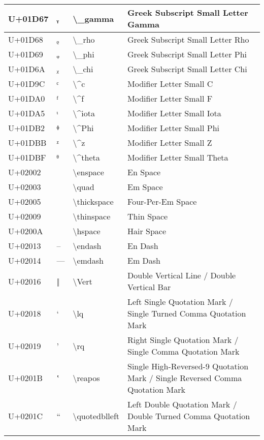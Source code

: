 \begin{table}[h]
\begin{tabulary}{\linewidth}{|L|L|L|L|}
\hline
U+01D67 & ᵧ & {\textbackslash}\_gamma & Greek Subscript Small Letter Gamma \\
\hline
U+01D68 & ᵨ & {\textbackslash}\_rho & Greek Subscript Small Letter Rho \\
\hline
U+01D69 & ᵩ & {\textbackslash}\_phi & Greek Subscript Small Letter Phi \\
\hline
U+01D6A & ᵪ & {\textbackslash}\_chi & Greek Subscript Small Letter Chi \\
\hline
U+01D9C & ᶜ & {\textbackslash}{\textasciicircum}c & Modifier Letter Small C \\
\hline
U+01DA0 & ᶠ & {\textbackslash}{\textasciicircum}f & Modifier Letter Small F \\
\hline
U+01DA5 & ᶥ & {\textbackslash}{\textasciicircum}iota & Modifier Letter Small Iota \\
\hline
U+01DB2 & ᶲ & {\textbackslash}{\textasciicircum}Phi & Modifier Letter Small Phi \\
\hline
U+01DBB & ᶻ & {\textbackslash}{\textasciicircum}z & Modifier Letter Small Z \\
\hline
U+01DBF & ᶿ & {\textbackslash}{\textasciicircum}theta & Modifier Letter Small Theta \\
\hline
U+02002 &   & {\textbackslash}enspace & En Space \\
\hline
U+02003 &   & {\textbackslash}quad & Em Space \\
\hline
U+02005 &   & {\textbackslash}thickspace & Four-Per-Em Space \\
\hline
U+02009 &   & {\textbackslash}thinspace & Thin Space \\
\hline
U+0200A &   & {\textbackslash}hspace & Hair Space \\
\hline
U+02013 & – & {\textbackslash}endash & En Dash \\
\hline
U+02014 & — & {\textbackslash}emdash & Em Dash \\
\hline
U+02016 & ‖ & {\textbackslash}Vert & Double Vertical Line / Double Vertical Bar \\
\hline
U+02018 & ‘ & {\textbackslash}lq & Left Single Quotation Mark / Single Turned Comma Quotation Mark \\
\hline
U+02019 & ’ & {\textbackslash}rq & Right Single Quotation Mark / Single Comma Quotation Mark \\
\hline
U+0201B & ‛ & {\textbackslash}reapos & Single High-Reversed-9 Quotation Mark / Single Reversed Comma Quotation Mark \\
\hline
U+0201C & “ & {\textbackslash}quotedblleft & Left Double Quotation Mark / Double Turned Comma Quotation Mark \\

\end{tabulary}
\end{table}
